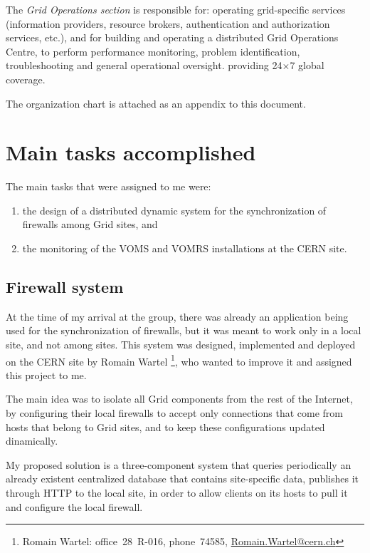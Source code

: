 \documentclass[12pt]{article}
\begin{document}
    The \emph{Grid Operations section} is responsible for: operating grid-specific
    services (information providers, resource brokers, authentication and
    authorization services, etc.), and for building and operating a distributed
    Grid Operations Centre, to perform performance monitoring, problem
    identification, troubleshooting and general operational oversight.
    providing 24$\times$7 global coverage.

    The organization chart is attached as an appendix to this document.

  \section{Main tasks accomplished}
    The main tasks that were assigned to me were:
    \begin{enumerate}
        \item the design of a distributed dynamic system for the
            synchronization of firewalls among Grid sites, and
        \item the monitoring of the VOMS and VOMRS installations at the CERN
            site.
    \end{enumerate}

    \subsection{Firewall system}
    At the time of my arrival at the group, there was already an application
    being used for the synchronization of firewalls, but it was meant to
    work only in a local site, and not among sites.  This system was designed,
    implemented and deployed on the CERN site by Romain Wartel%
    \footnote{Romain Wartel: office~28~R-016, phone~74585, \url{Romain.Wartel@cern.ch}},
    who wanted to improve it and assigned this project to me.

    The main idea was to isolate all Grid components from the rest of the
    Internet, by configuring their local firewalls to accept only connections
    that come from hosts that belong to Grid sites, and to keep these
    configurations updated dinamically.

    My proposed solution is a three-component system that queries periodically
    an already existent centralized database that contains site-specific data,
    publishes it through HTTP to the local site, in order to allow clients on
    its hosts to pull it and configure the local firewall.
\end{document}

